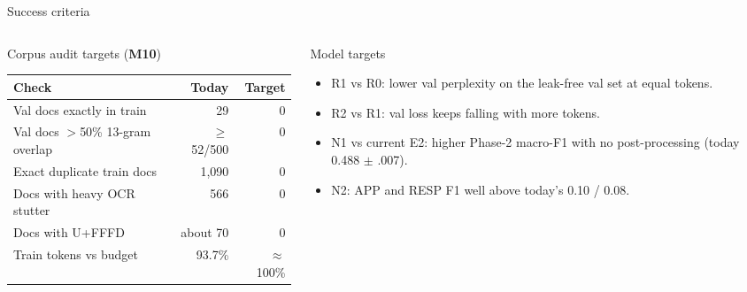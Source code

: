\documentclass[aspectratio=169,11pt]{beamer}
\newcommand{\mt}[1]{\textbf{\textcolor{aqua!80!black}{#1}}} %
\begin{document}
\begin{frame}{Success criteria}
  \begin{columns}[T]
    \begin{column}{0.52\textwidth}
      \footnotesize
      \begin{block}{Corpus audit targets (\mt{M10})}
        \begin{tabular}{lrr}
          \toprule
          Check & Today & Target \\
          \midrule
          Val docs exactly in train   & 29     & 0 \\
          Val docs $>$50\% 13-gram overlap & $\ge$52/500 & 0 \\
          Exact duplicate train docs  & 1{,}090 & 0 \\
          Docs with heavy OCR stutter & 566    & 0 \\
          Docs with U+FFFD            & about 70 & 0 \\
          Train tokens vs budget      & 93.7\% & $\approx$100\% \\
          \bottomrule
        \end{tabular}
      \end{block}
    \end{column}
    \begin{column}{0.44\textwidth}
      \footnotesize
      \begin{block}{Model targets}
        \begin{itemize}
          \item R1 vs R0: lower val perplexity on the leak-free val set at equal tokens.
          \item R2 vs R1: val loss keeps falling with more tokens.
          \item N1 vs current E2: higher Phase-2 macro-F1 with no post-processing (today 0.488 $\pm$ .007).
          \item N2: APP and RESP F1 well above today's 0.10 / 0.08.
        \end{itemize}
      \end{block}
    \end{column}
  \end{columns}
\end{frame}
\end{document}
